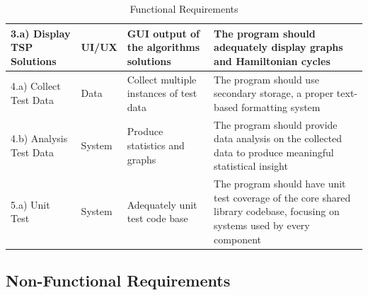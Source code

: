 \begin{table}[!ht]
\begin{tabularx}{\textwidth}{
    |>{\raggedright\arraybackslash}p{3cm}
    |>{\raggedright\arraybackslash}p{1.3cm}
    |>{\raggedright\arraybackslash}p{4cm}
    |>{\raggedright\arraybackslash}X|}
3.a) Display TSP Solutions                     & UI/UX                                    & GUI output of the algorithms solutions      & The program should adequately display graphs and Hamiltonian cycles                                                         \\ \hline
4.a) Collect Test Data                         & Data                                     & Collect multiple instances of test data     & The program should use secondary storage, a proper text-based formatting system                                             \\ \hline
4.b) Analysis Test Data                        & System                                   & Produce statistics and graphs               & The program should provide data analysis on the collected data to produce meaningful statistical insight                    \\ \hline
5.a) Unit Test                                 & System                                   & Adequately unit test code base              & The program should have unit test coverage of the core shared library codebase, focusing on systems used by every component \\ \hline

    \end{tabularx}
    \caption{Functional Requirements}
    \label{tab:functionalreq}
\end{table}
\pagebreak

\subsection{Non-Functional Requirements}

